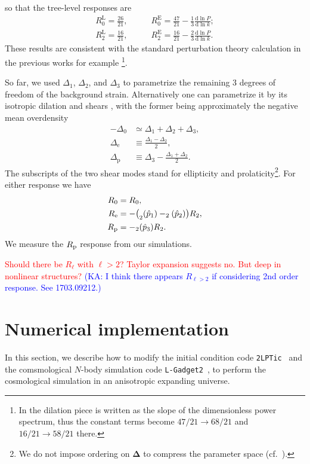 \documentclass[a4paper,11pt]{article}
\let\L\relax
\DeclareMathOperator{\L}{\mathcal{L}}
\renewcommand{\d}{\mathrm{d}}
\newcommand{\vDelta}{{\bm\Delta}}
\newcommand{\Euler}{\mathrm{E}}
\newcommand{\Lagrange}{\mathrm{L}}
\newcommand{\HL}[1]{\textcolor{red}{#1}} %
\newcommand{\KA}[1]{\textcolor{Blue}{(KA: #1)}}
\begin{document}
so that the tree-level responses are
\begin{align}
    R^\Lagrange_0 = \frac{26}{21}, \qquad
    & R^\Euler_0 = \frac{47}{21} - \frac13 \frac{\d\ln P}{\d\ln k};
    \nonumber\\
    R^\Lagrange_2 = \frac{16}{21}, \qquad
    & R^\Euler_2 = \frac{16}{21} - \frac23 \frac{\d\ln P}{\d\ln k}.
\end{align}
These results are consistent with the standard perturbation theory calculation
in the previous works for example \cite{LiSchmittfullSeljak17}\footnote{In
\cite{LiSchmittfullSeljak17} the dilation piece is written as the slope of the
dimensionless power spectrum, thus the constant terms become $47/21 \to 68/21$
and $16/21 \to 58/21$ there.}.

So far, we used $\Delta_1$, $\Delta_2$, and $\Delta_3$ to parametrize the remaining 3 degrees of freedom of the
background strain.
Alternatively one can parametrize it
 by its isotropic dilation and shears \cite{BondMyers96I},
with the former being approximately the negative mean overdensity
\begin{align}
    -\Delta_0 &\simeq \Delta_1 + \Delta_2 + \Delta_3, \nonumber\\
    \Delta_\mathrm{e} &\equiv \frac{\Delta_1 - \Delta_2}2, \nonumber\\
    \Delta_\mathrm{p} &\equiv \Delta_3 - \frac{\Delta_1 + \Delta_2}2.
\end{align}
The subscripts of the two shear modes stand for ellipticity and
prolaticity\footnote{We do not impose ordering on $\vDelta$ to compress the
parameter space (cf.\ \cite{BondMyers96I}).}.
For either response we have
\begin{align}
    R_0 &= R_0, \nonumber\\
    R_\mathrm{e}
    &= - \bigl(\L_2(\hat p_1) - \L_2(\hat p_2)\bigr) R_2, \nonumber\\
    R_\mathrm{p} &= - \L_2(\hat p_3) R_2.
\end{align}
We measure the $R_{\rm p}$ response from our simulations.

\HL{Should there be $R_\ell$ with $\ell>2$? Taylor expansion suggests
no. But deep in nonlinear structures?}
\KA{I think there appears $R_{\ell >2}$ if considering 2nd order response. See 1703.09212.}



\section{Numerical implementation}
\label{sec:num}
In this section, we describe how to modify the initial condition code 
\texttt{2LPTic}~\cite{} and 
the comsmological $N$-body simulation code \texttt{L-Gadget2}~\cite{Springel:2005},
to perform the cosmological simulation in an anisotropic expanding universe.
\end{document}

